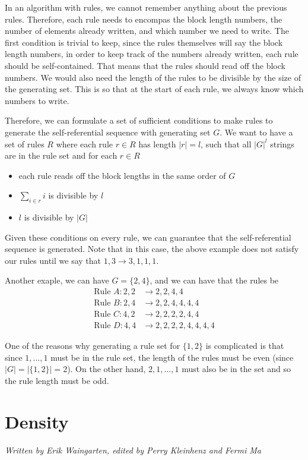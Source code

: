 \documentclass[runningheads,a4paper]{llncs}
\begin{document}
In an algorithm with rules, we cannot remember anything about the previous rules. Therefore, each rule needs to encompas the block length numbers, the number of elements already written, and which number we need to write. The first condition is trivial to keep, since the rules themselves will say the block length numbers, in order to keep track of the numbers already written, each rule should be self-contained. That means that the rules should read off the block numbers. We would also need the length of the rules to be divisible by the size of the generating set. This is so that at the start of each rule, we always know which numbers to write.

Therefore, we can formulate a set of sufficient conditions to make rules to generate the self-referential sequence with generating set $G$. We want to have a set of rules $R$ where each rule $r \in R$ has length $|r| = l$, such that all $|G|^{l}$ strings are in the rule set and for each $r \in R$
\begin{itemize}
\item each rule reads off the block lengths in the same order of $G$
\item $\sum_{i \in r} i$ is divisible by $l$
\item $l$ is divisible by $|G|$
\end{itemize}
Given these conditions on every rule, we can guarantee that the self-referential sequence is generated. Note that in this case, the above example does not satisfy our rules until we say that $1, 3 \to 3, 1, 1, 1$.

Another exaple, we can have $G = \{ 2, 4 \}$, and we can have that the rules be
\begin{align*}
\text{Rule }A: 2,2 &\to 2, 2, 4, 4 \\
\text{Rule }B: 2,4 &\to 2, 2, 4,4,4,4\\
\text{Rule }C: 4,2 &\to 2,2,2,2,4,4\\
\text{Rule }D: 4,4 &\to 2, 2, 2, 2, 4, 4, 4, 4
\end{align*}

One of the reasons why generating a rule set for $\{1, 2\}$ is complicated is that since $1, ..., 1$ must be in the rule set, the length of the rules must be even (since $|G| = |\{1, 2\}| = 2$). On the other hand, $2, 1, ..., 1$ must also be in the set and so the rule length must be odd.  

\section{Density}
\label{density}
\emph{Written by Erik Waingarten, edited by Perry Kleinhenz and Fermi Ma}
\end{document}
